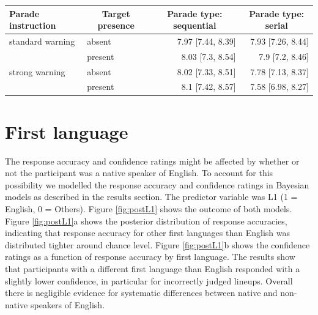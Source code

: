 \begin{appendix}
\begin{table}[h]
\begin{center}
\begin{threeparttable}
\begin{tabular}{llrr}
\toprule
Parade instruction & \multicolumn{1}{c}{Target presence} & \multicolumn{1}{c}{Parade type: sequential} & \multicolumn{1}{c}{Parade type:  serial}\\
\midrule
standard warning & absent & 7.97 [7.44, 8.39] & 7.93 [7.26, 8.44]\\
 & present & 8.03 [7.3, 8.54] & 7.9 [7.2, 8.46]\\
strong warning & absent & 8.02 [7.33, 8.51] & 7.78 [7.13, 8.37]\\
 & present & 8.1 [7.42, 8.57] & 7.58 [6.98, 8.27]\\
\bottomrule
\end{tabular}

\end{threeparttable}
\end{center}

\end{table}

\hypertarget{first-language}{%
\section{First language}\label{first-language}}

The response accuracy and confidence ratings might be affected by
whether or not the participant was a native speaker of English. To
account for this possibility we modelled the response accuracy and
confidence ratings in Bayesian models as described in the results
section. The predictor variable was L1 (1 = English, 0 = Others). Figure
\ref{fig:postL1} shows the outcome of both models. Figure
\ref{fig:postL1}a shows the posterior distribution of response
accuracies, indicating that response accuracy for other first languages
than English was distributed tighter around chance level. Figure
\ref{fig:postL1}b shows the confidence ratings as a function of response
accuracy by first language. The results show that participants with a
different first language than English responded with a slightly lower
confidence, in particular for incorrectly judged lineups. Overall there
is negligible evidence for systematic differences between native and
non-native speakers of English.

\begin{figure}[!ht]


\end{figure}
\end{appendix}
